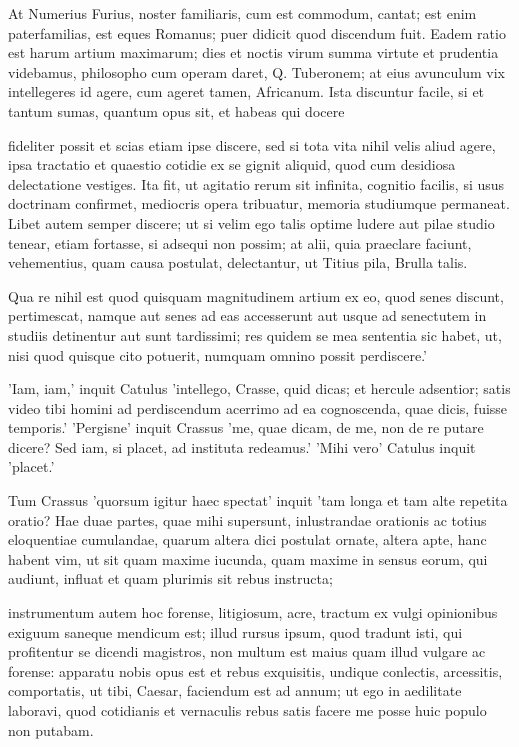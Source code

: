  At Numerius Furius, noster familiaris, cum est commodum, cantat; est enim paterfamilias, est eques Romanus; puer didicit quod discendum fuit. Eadem ratio est harum artium maximarum; dies et noctis virum summa virtute et prudentia videbamus, philosopho cum operam daret, Q. Tuberonem; at eius avunculum vix intellegeres id agere, cum ageret tamen, Africanum. Ista discuntur facile, si et tantum sumas, quantum opus sit, et habeas qui docere

 fideliter possit et scias etiam ipse discere, sed si tota vita nihil velis aliud agere, ipsa tractatio et quaestio cotidie ex se gignit aliquid, quod cum desidiosa delectatione vestiges. Ita fit, ut agitatio rerum sit infinita, cognitio facilis, si usus doctrinam confirmet, mediocris opera tribuatur, memoria studiumque permaneat. Libet autem semper discere; ut si velim ego talis optime ludere aut pilae studio tenear, etiam fortasse, si adsequi non possim; at alii, quia praeclare faciunt, vehementius, quam causa postulat, delectantur, ut Titius pila, Brulla talis.

 Qua re nihil est quod quisquam magnitudinem artium ex eo, quod senes discunt, pertimescat, namque aut senes ad eas accesserunt aut usque ad senectutem in studiis detinentur aut sunt tardissimi; res quidem se mea sententia sic habet, ut, nisi quod quisque cito potuerit, numquam omnino possit perdiscere.'

 'Iam, iam,' inquit Catulus 'intellego, Crasse, quid dicas; et hercule adsentior; satis video tibi homini ad perdiscendum acerrimo ad ea cognoscenda, quae dicis, fuisse temporis.' 'Pergisne' inquit Crassus 'me, quae dicam, de me, non de re putare dicere? Sed iam, si placet, ad instituta redeamus.' 'Mihi vero' Catulus inquit 'placet.'

 Tum Crassus 'quorsum igitur haec spectat' inquit 'tam longa et tam alte repetita oratio? Hae duae partes, quae mihi supersunt, inlustrandae orationis ac totius eloquentiae cumulandae, quarum altera dici postulat ornate, altera apte, hanc habent vim, ut sit quam maxime iucunda, quam maxime in sensus eorum, qui audiunt, influat et quam plurimis sit rebus instructa;

 instrumentum autem hoc forense, litigiosum, acre, tractum ex vulgi opinionibus exiguum saneque mendicum est; illud rursus ipsum, quod tradunt isti, qui profitentur se dicendi magistros, non multum est maius quam illud vulgare ac forense: apparatu nobis opus est et rebus exquisitis, undique conlectis, arcessitis, comportatis, ut tibi, Caesar, faciendum est ad annum; ut ego in aedilitate laboravi, quod cotidianis et vernaculis rebus satis facere me posse huic populo non putabam.

